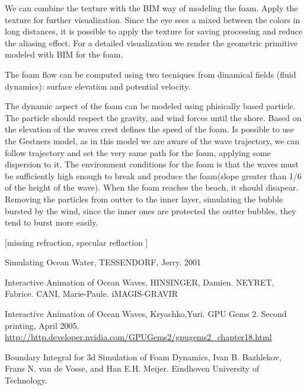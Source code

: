 \documentclass{report}
\begin{document}
We can combine the texture with the BIM way of modeling the foam. Apply the texture for further visualization. Since the eye sees a mixed between the colors in long distances, it is possible to apply the texture for saving processing and reduce the aliasing effect.
For a detailed visualization we render the geometric primitive modeled with BIM for the foam.

The foam flow can be computed using two tecniques from dinamical fields (fluid dynamics): surface elevation and potential velocity.

The dynamic aspect of the foam can be modeled using phisically based particle. The particle should respect the gravity, and wind forces until the shore. Based on the elevation of the waves crest defines the speed of the foam. Is possible to use the Gestners model, as in this model we are aware of the wave trajectory, we can follow trajectory and set the very same path for the foam, applying some dispersion to it\cite{iaow}.
The environment conditions for the foam is that the waves must be sufficiently high enough to break and produce the foam(slope greater than 1/6 \cite{sow} of the height of the wave).
When the foam reaches the beach, it should disapear. Removing the particles from outter to the inner layer, simulating the bubble bursted by the wind, since the inner ones are protected the outter bubbles, they tend to burst more easily.

[missing refraction, specular reflaction ]


\begin{thebibliography}{9}

  Simulating Ocean Water,
  TESSENDORF, Jerry.
  2001

  Interactive Animation of Ocean Waves,
  HINSINGER, Damien. NEYRET, Fabrice. CANI, Marie-Paule.
  iMAGIS-GRAVIR

  Interactive Animation of Ocean Waves,
  Kryachko,Yuri.
  GPU Gems 2. 
  Second printing, April 2005.
  \url{http://http.developer.nvidia.com/GPUGems2/gpugems2_chapter18.html}

  Boundary Integral for 3d Simulation of Foam Dynamics,
  Ivan B. Bazhlekov, Frans N. van de Vosse, and Han E.H. Meijer.
  Eindhoven University of Technology.

\end{thebibliography}
\end{document}
